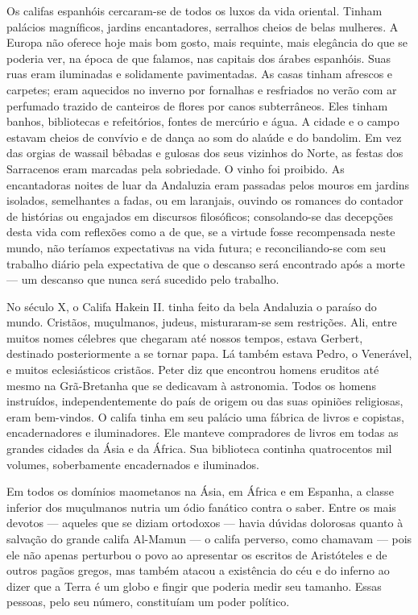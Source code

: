 \documentclass[11pt,a5paper,twoside,openany]{book}
\begin{document}
Os califas espanhóis cercaram-se de todos os luxos da vida oriental. Tinham palácios magníficos, jardins encantadores, serralhos cheios de belas mulheres. A Europa não oferece hoje mais bom gosto, mais requinte, mais elegância do que se poderia ver, na época de que falamos, nas capitais dos árabes espanhóis. Suas ruas eram iluminadas e solidamente pavimentadas. As casas tinham afrescos e carpetes; eram aquecidos no inverno por fornalhas e resfriados no verão com ar perfumado trazido de canteiros de flores por canos subterrâneos. Eles tinham banhos, bibliotecas e refeitórios, fontes de mercúrio e água. A cidade e o campo estavam cheios de convívio e de dança ao som do alaúde e do bandolim. Em vez das orgias de wassail bêbadas e gulosas dos seus vizinhos do Norte, as festas dos Sarracenos eram marcadas pela sobriedade. O vinho foi proibido. As encantadoras noites de luar da Andaluzia eram passadas pelos mouros em jardins isolados, semelhantes a fadas, ou em laranjais, ouvindo os romances do contador de histórias ou engajados em discursos filosóficos; consolando-se das decepções desta vida com reflexões como a de que, se a virtude fosse recompensada neste mundo, não teríamos expectativas na vida futura; e reconciliando-se com seu trabalho diário pela expectativa de que o descanso será encontrado após a morte — um descanso que nunca será sucedido pelo trabalho.

No século X, o Califa Hakein II. tinha feito da bela Andaluzia o paraíso do mundo. Cristãos, muçulmanos, judeus, misturaram-se sem restrições. Ali, entre muitos nomes célebres que chegaram até nossos tempos, estava Gerbert, destinado posteriormente a se tornar papa. Lá também estava Pedro, o Venerável, e muitos eclesiásticos cristãos. Peter diz que encontrou homens eruditos até mesmo na Grã-Bretanha que se dedicavam à astronomia. Todos os homens instruídos, independentemente do país de origem ou das suas opiniões religiosas, eram bem-vindos. O califa tinha em seu palácio uma fábrica de livros e copistas, encadernadores e iluminadores. Ele manteve compradores de livros em todas as grandes cidades da Ásia e da África. Sua biblioteca continha quatrocentos mil volumes, soberbamente encadernados e iluminados.

Em todos os domínios maometanos na Ásia, em África e em Espanha, a classe inferior dos muçulmanos nutria um ódio fanático contra o saber. Entre os mais devotos — aqueles que se diziam ortodoxos — havia dúvidas dolorosas quanto à salvação do grande califa Al-Mamun — o califa perverso, como chamavam — pois ele não apenas perturbou o povo ao apresentar os escritos de Aristóteles e de outros pagãos gregos, mas também atacou a existência do céu e do inferno ao dizer que a Terra é um globo e fingir que poderia medir seu tamanho. Essas pessoas, pelo seu número, constituíam um poder político.
\end{document}
